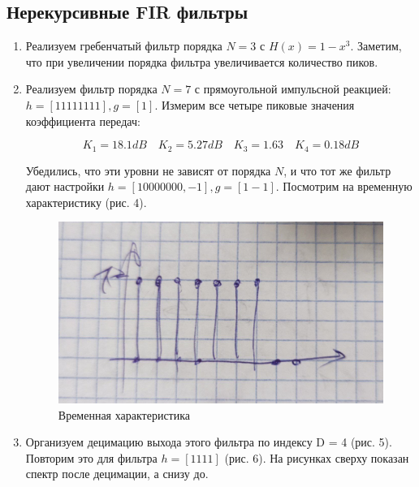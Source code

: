 \documentclass[a4paper, 12pt]{article}%
\begin{document}
\subsection{Нерекурсивные FIR фильтры}

\begin{enumerate}
\item Реализуем гребенчатый фильтр порядка $N = 3$ с $H(x) = 1 - x^3$. Заметим, что при увеличении порядка фильтра увеличивается количество пиков.

\item Реализуем фильтр порядка $N = 7$ с прямоугольной импульсной реакцией: $h = [1 1 1 1 1 1 1 1], g = [1]$. Измерим все четыре пиковые значения коэффициента передач:

\[K_1 = 18.1 dB \quad K_2 = 5.27 dB \quad K_3 = 1.63 \quad K_4 = 0.18 dB\]

Убедились, что эти уровни не зависят от порядка $N$, и что тот же фильтр дают настройки $h = [1 0 0 0 0 0 0 0, -1], g = [1 -1]$. Посмотрим на временную характеристику (рис. 4).

\begin{figure}[h!]
\centering
\includegraphics[scale=0.2]{images/3.2.jpg}
\caption{Временная характеристика}
\label{2.2}
\end{figure}

\item Организуем децимацию выхода этого фильтра по индексу D = 4 (рис. 5). Повторим это для фильтра $h = [1 1 1 1]$ (рис. 6). На рисунках сверху показан спектр после децимации, а снизу до.


\end{enumerate}
\end{document}
